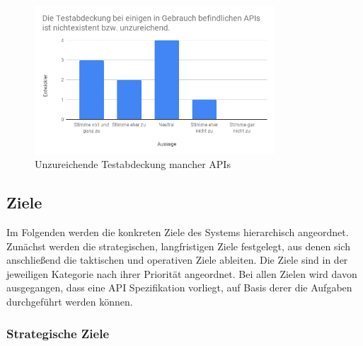 \begin{figure}[H]
\centering
  \includegraphics[width=0.8\textwidth]{../images/insufficient_coverage.png}
  \caption{Unzureichende Testabdeckung mancher APIs}
  \label{fig:sv-insufficient-coverage}
\end{figure}

\subsection{Ziele}

Im Folgenden werden die konkreten Ziele des Systems hierarchisch angeordnet. Zunächst werden die strategischen, langfristigen Ziele festgelegt, aus denen sich anschließend die taktischen und operativen Ziele ableiten. Die Ziele sind in der jeweiligen Kategorie nach ihrer Priorität angeordnet. Bei allen Zielen wird davon ausgegangen, dass eine API Spezifikation vorliegt, auf Basis derer die Aufgaben durchgeführt werden können.


\subsubsection{Strategische Ziele}

